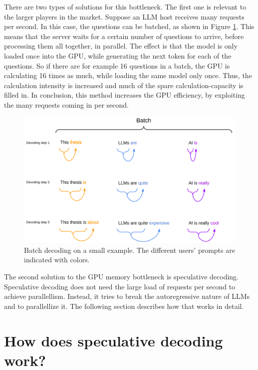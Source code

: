There are two types of solutions for this bottleneck. The first one is relevant to the larger players in the market. Suppose an LLM host receives many requests per second. In this case, the questions can be batched, as shown in Figure \ref{fig:spec_dec_batch}. This means that the server waits for a certain number of questions to arrive, before processing them all together, in parallel. The effect is that the model is only loaded once into the GPU, while generating the next token for each of the questions. So if there are for example 16 questions in a batch, the GPU is calculating 16 times as much, while loading the same model only once. Thus, the calculation intensity is increased and much of the spare calculation-capacity is filled in. In conclusion, this method increases the GPU efficiency, by exploiting the many requests coming in per second.

\begin{figure}[h]
	\centering
	\includegraphics[width=1\linewidth]{fig/spec_dec_batch.png}
	\caption{Batch decoding on a small example. The different users' prompts are indicated with colors.}
	\label{fig:spec_dec_batch}
\end{figure}

The second solution to the GPU memory bottleneck is speculative decoding. Speculative decoding does not need the large load of requests per second to achieve parallellism. Instead, it tries to break the autoregressive nature of LLMs and to parallellize it. The following section describes how that works in detail.

\section{How does speculative decoding work?}

